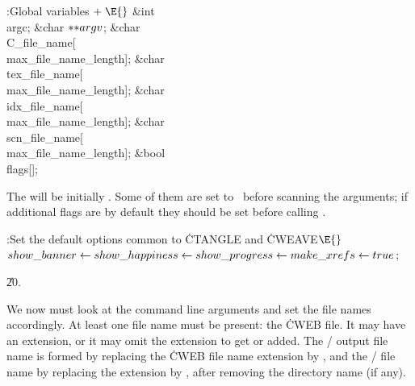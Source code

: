 \Y\B\4:Global variables\X${}\mathrel+\E{}$\6
\&{int} \\{argc};\6
\&{char} ${}{*}{*}\\{argv}{}$;\6
\&{char} \\{C\_file\_name}[\\{max\_file\_name\_length}];\6
\&{char} \\{tex\_file\_name}[\\{max\_file\_name\_length}];\6
\&{char} \\{idx\_file\_name}[\\{max\_file\_name\_length}];\6
\&{char} \\{scn\_file\_name}[\\{max\_file\_name\_length}];\6
\&{bool} \\{flags}[];\par
\fi

The  will be initially . Some of them are set
to~ before
scanning the arguments; if additional flags are  by default they
should be set before calling .

\Y\B\4:Set the default options common to \.{CTANGLE} and \.{CWEAVE}\X${}%
\E{}$\6
$\\{show\_banner}\K\\{show\_happiness}\K\\{show\_progress}\K\\{make\_xrefs}\K%
\\{true}{}$;\par
\U20.\fi

We now must look at the command line arguments and set the file names
accordingly.  At least one file name must be present: the \.{CWEB}
file.  It may have an extension, or it may omit the extension to get  or
 added.  The \TEX/ output file name is formed by replacing the %
\.{CWEB}
file name extension by , and the \CEE/ file name by replacing
the extension by , after removing the directory name (if any).

